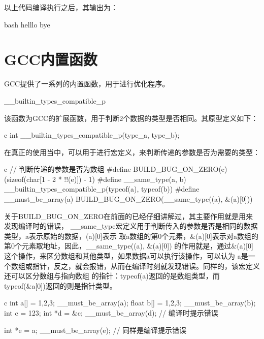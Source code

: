 以上代码编译执行之后，其输出为：
\begin{code-block}{bash}
helllo
bye
\end{code-block}

\section{GCC内置函数}
GCC提供了一系列的内置函数，用于进行优化程序。

\begin{outline}[enumerate]

\1 \_\_builtin\_types\_compatible\_p

该函数为GCC的扩展函数，用于判断2个数据的类型是否相同。其原型定义如下：
\begin{code-in-enumerate}{c}
  int __builtin_types_compatible_p(type_a, type_b);
\end{code-in-enumerate}

在真正的使用当中，可以用于进行宏定义，来判断传递的参数是否为需要的类型：
\begin{code-in-enumerate}{c}
// 判断传递的参数是否为数组
#define BUILD_BUG_ON_ZERO(e) (sizeof(char[1 - 2 * !!(e)]) - 1)
#define __same_type(a, b) __builtin_types_compatible_p(typeof(a), typeof(b))
#define __must_be_array(a) BUILD_BUG_ON_ZERO(__same_type((a), &(a)[0]))
\end{code-in-enumerate}

关于BUILD\_BUG\_ON\_ZERO在前面的已经仔细讲解过，其主要作用就是用来发现编译时的错误，
\_\_same\_type宏定义用于判断传入的参数是否是相同的数据类型，a表示原始的数据，(a)[0]表示
取a数组的第0个元素，\&(a)[0]表示对a数组的第0个元素取地址，因此，\_\_same\_type((a), \&(a)[0])
的作用就是，通过\&(a)[0]这个操作，来区分数组和其他类型，如果数据a可以执行该操作，可以认为
a是一个数组或指针，反之，就会报错，从而在编译时刻就发现错误。同样的，该宏定义还可以区分数组与指向数组
的指针：typeof(a)返回的是数组类型，而typeof(\&a[0])返回的则是指针类型。

\begin{code-in-enumerate}{c}
int a[] = {1,2,3};
__must_be_array(a);
float b[] = {1,2,3};
__must_be_array(b);
int c = 123;
int *d = &c;
__must_be_array(d); // 编译时提示错误

int *e = a;
__must_be_array(e); // 同样是编译提示错误
\end{code-in-enumerate}

\end{outline}

